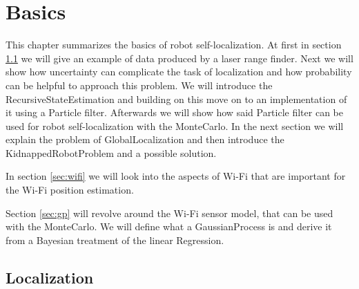 \chapter{Basics} %
\label{Chapter2}
This chapter summarizes the basics of robot self-localization. At first in section \ref{sec:localization} we will give an example of data produced by a laser range finder. Next we will show how uncertainty can complicate the task of localization and how probability can be helpful to approach this problem. We will introduce the \gls{RecursiveStateEstimation} and building on this move on to an implementation of it using a \gls{Particle} filter. Afterwards we will show how said \gls{Particle} filter can be used for robot self-localization with the \Gls{MonteCarlo}. In the next section we will explain the problem of \gls{GlobalLocalization} and then introduce the \gls{KidnappedRobotProblem} and a possible solution.

In section \ref{sec:wifi} we will look into the aspects of Wi-Fi that are important for the Wi-Fi position estimation.

Section \ref{sec:gp} will revolve around the Wi-Fi sensor model, that can be used with the \Gls{MonteCarlo}. We will define what a \Gls{GaussianProcess} is and derive it from a Bayesian treatment of the linear \gls{Regression}. 

\section{Localization} \label{sec:localization}
